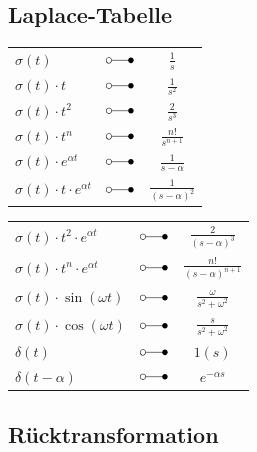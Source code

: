 	\subsection{Laplace-Tabelle}
	\begin{multicols}{2}
		\begin{center}
			\begin{tabular}{|lcc|}
				\hline
				$\sigma \left( t \right)$ & $\laplace$ & $\frac{1}{s}$ \\
				$\sigma \left( t \right) \cdot t$ & $\laplace$ & $\frac{1}{s^2}$\\
				$\sigma \left( t \right) \cdot t^2$ & $\laplace$ & $\frac{2}{s^3}$\\
				$\sigma \left( t \right) \cdot t^n$ & $\laplace$ & $\frac{n!}{s^{n+1}}$\\
				$\sigma \left( t \right) \cdot e^{\alpha t}$ & $\laplace$ &
				$\frac{1}{s-\alpha}$\\
				$\sigma \left( t \right) \cdot t \cdot e^{\alpha t}$ & $\laplace$ &
				$\frac{1}{( s - \alpha )^2}$\\
				\hline
			\end{tabular}
		\end{center}
	\columnbreak
		\begin{center}
			\begin{tabular}{|lcc|}
				\hline
				$\sigma \left( t \right)\cdot t^2 \cdot e^{\alpha t}$ &
				$\laplace$ & $\frac{2}{{( s - \alpha )}^3}$\\
				$\sigma \left( t \right)\cdot t^n \cdot e^{ \alpha t}$ &
				$\laplace$ & $\frac{n!}{(s-\alpha)^{n+1}}$\\
				$\sigma \left( t \right) \cdot \sin \left(\omega t \right)$ & $\laplace$ &
				$\frac{\omega}{s^2 + {\omega^2}}$\\
				$\sigma \left( t \right) \cdot \cos \left( \omega t \right)$ & $\laplace$ &
				$\frac{s}{ s^2 + \omega^2}$\\
				$\delta \left( t \right)$ & $\laplace$ & $1\left( s \right)$ \\
				$\delta \left( t - \alpha \right)$ & $\laplace$ & $e^{- \alpha s}$\\
				\hline
			\end{tabular}
		\end{center}
	\end{multicols}
		
	\subsection{Rücktransformation}
